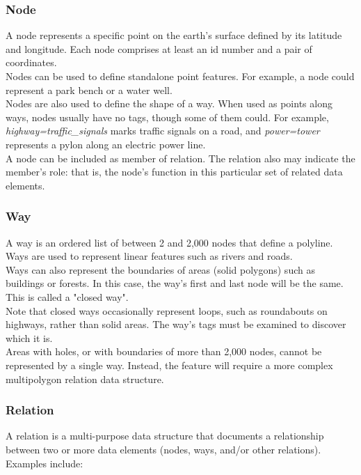 \subsubsection{Node}
A node represents a specific point on the earth's surface defined by its latitude and longitude. Each node comprises at least an id number and a pair of coordinates.\\
Nodes can be used to define standalone point features. For example, a node could represent a park bench or a water well.\\
Nodes are also used to define the shape of a way. When used as points along ways, nodes usually have no tags, though some of them could. For example, \textit{highway=traffic\_signals} marks traffic signals on a road, and \textit{power=tower} represents a pylon along an electric power line.\\
A node can be included as member of relation. The relation also may indicate the member's role: that is, the node's function in this particular set of related data elements. \cite{OSMElements}
\subsubsection{Way}
A way is an ordered list of between 2 and 2,000 nodes that define a polyline. Ways are used to represent linear features such as rivers and roads.\\
Ways can also represent the boundaries of areas (solid polygons) such as buildings or forests. In this case, the way's first and last node will be the same. This is called a "closed way".\\
Note that closed ways occasionally represent loops, such as roundabouts on highways, rather than solid areas. The way's tags must be examined to discover which it is.\\
Areas with holes, or with boundaries of more than 2,000 nodes, cannot be represented by a single way. Instead, the feature will require a more complex multipolygon relation data structure. \cite{OSMElements}
\subsubsection{Relation}
A relation is a multi-purpose data structure that documents a relationship between two or more data elements (nodes, ways, and/or other relations). Examples include:

